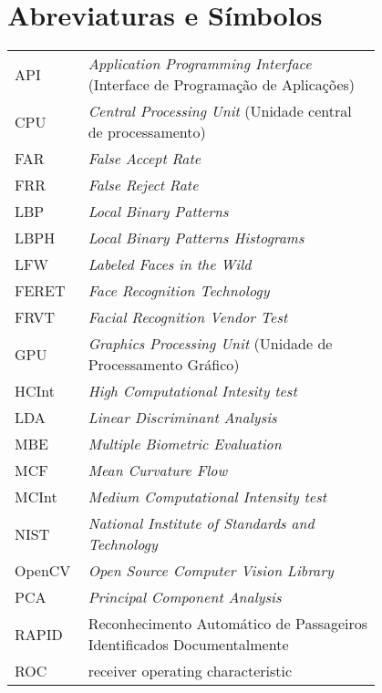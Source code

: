 \chapter*{Abreviaturas e Símbolos}

\begin{flushleft}
\begin{tabular}{l p{0.8\linewidth}}
API		& \textit{Application Programming Interface} (Interface de Programação de Aplicações) \\
CPU		& \textit{Central Processing Unit} (Unidade central de processamento)\\
FAR     & \textit{False Accept Rate} \\
FRR		& \textit{False Reject Rate} \\
LBP 	& \textit{Local Binary Patterns}\\
LBPH	& \textit{Local Binary Patterns Histograms}\\
LFW		& \textit{Labeled Faces in the Wild}\\
FERET   & \textit{Face Recognition Technology}\\
FRVT    & \textit{Facial Recognition Vendor Test}\\
GPU		& \textit{Graphics Processing Unit} (Unidade de Processamento Gráfico)\\
HCInt	& \textit{High Computational Intesity test}\\
LDA		& \textit{Linear Discriminant Analysis}\\
MBE		& \textit{Multiple Biometric Evaluation}\\
MCF		& \textit{Mean Curvature Flow}\\
MCInt	& \textit{Medium Computational Intensity test}\\
NIST	& \textit{National Institute of Standards and Technology} \\
OpenCV	& \textit{Open Source Computer Vision Library} \\
PCA		& \textit{Principal Component Analysis}\\
RAPID	& Reconhecimento Automático de Passageiros Identificados Documentalmente \\
ROC		& receiver operating characteristic\\
\end{tabular}
\end{flushleft}


